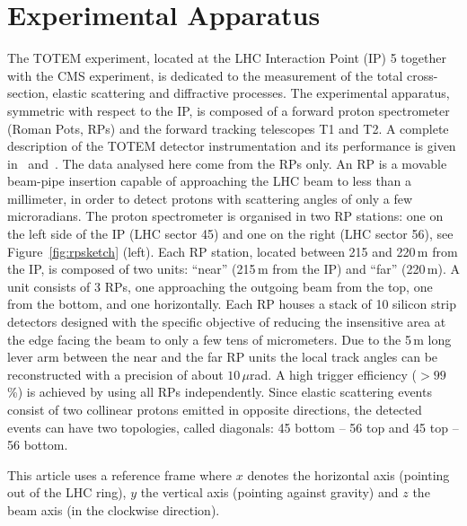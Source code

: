 \section{Experimental Apparatus}
\label{sec:exp apparatus}

The TOTEM experiment, located at the LHC Interaction Point (IP) 5 together with
the CMS experiment, is dedicated to the measurement of the total 
cross-section, elastic scattering
and diffractive processes. The experimental
apparatus, symmetric with respect to the IP, is 
composed of a forward proton spectrometer (Roman Pots, RPs) and the 
forward tracking telescopes T1 and T2. 
A complete description of the TOTEM detector instrumentation 
and its performance is given in~\cite{totem-jinst} and~\cite{totem-ijmp}. 
The data analysed here come from the RPs only. An RP is a movable beam-pipe
insertion capable of approaching the LHC beam to less than a millimeter, in 
order to detect protons with scattering angles of only a few microradians. 
The proton spectrometer is organised in two RP stations: one on the left side of the IP 
(LHC sector 45) and one on the right (LHC sector 56), see Figure~\ref{fig:rpsketch} (left).
Each RP station, located between 215 and 220\,m from the IP, is composed of two 
units: ``near'' (215\,m from the IP) and ``far'' (220\,m). 
A unit consists of 3 RPs, one
approaching the outgoing beam from the top, one from the bottom, and one 
horizontally.
Each RP houses a stack of 10 silicon
strip detectors designed with the specific objective of
reducing the insensitive area at the edge facing the beam
to only a few tens of micrometers. Due to the 5\,m long lever arm 
between the near and the far RP units 
the local track angles can be reconstructed
with a precision of about $10\,\mu$rad. A high trigger efficiency
($> 99$\%) is achieved by using all RPs independently. 
Since elastic scattering events consist of two collinear protons emitted in 
opposite directions, the detected events can have two topologies, called 
diagonals: 45 bottom -- 56 top and 45 top -- 56 bottom.

This article uses a reference frame where $x$ denotes the horizontal axis (pointing out of the LHC ring), $y$ the vertical axis (pointing against gravity) and $z$ the beam axis (in the clockwise direction).

